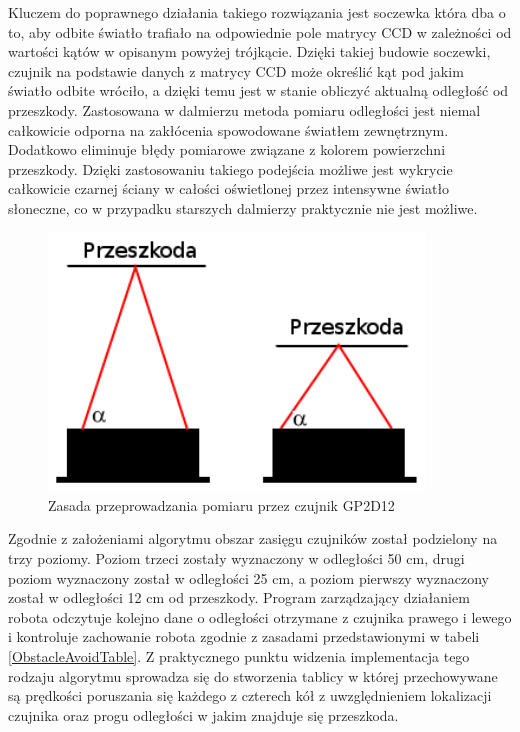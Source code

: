Kluczem do poprawnego działania takiego rozwiązania jest soczewka która dba o to, aby
odbite światło trafiało na odpowiednie pole matrycy CCD w zależności od wartości
kątów w opisanym powyżej trójkącie. Dzięki takiej budowie soczewki, czujnik na
podstawie danych z matrycy CCD może określić kąt pod jakim światło odbite
wróciło, a dzięki temu jest w stanie obliczyć aktualną odległość od przeszkody.
Zastosowana w dalmierzu metoda pomiaru odległości jest niemal całkowicie odporna
na zakłócenia spowodowane światłem zewnętrznym. Dodatkowo eliminuje błędy
pomiarowe związane z kolorem powierzchni przeszkody. Dzięki zastosowaniu takiego
podejścia możliwe jest wykrycie całkowicie czarnej ściany w całości oświetlonej
przez intensywne światło słoneczne, co w przypadku starszych dalmierzy
praktycznie nie jest możliwe.

\begin{figure}[h!]
 \centering
 \includegraphics[width=100mm]{../images/ch04/gp2d12_operation_theory.png}
 \caption{Zasada przeprowadzania pomiaru przez czujnik GP2D12}
 \label{fig:SharpGP2D12_opertaion_theory}
\end{figure} 

Zgodnie z założeniami algorytmu obszar zasięgu czujników został podzielony na
trzy poziomy. Poziom trzeci zostały wyznaczony w odległości 50 cm, drugi poziom
wyznaczony został w odległości 25 cm, a poziom pierwszy wyznaczony został w
odległości 12 cm od przeszkody. Program zarządzający działaniem robota odczytuje
kolejno dane o odległości otrzymane z czujnika prawego i lewego i kontroluje
zachowanie robota zgodnie z zasadami przedstawionymi w tabeli
\ref{ObstacleAvoidTable}. Z praktycznego punktu widzenia implementacja tego
rodzaju algorytmu sprowadza się do stworzenia tablicy w której przechowywane są
prędkości poruszania się każdego z czterech kół z uwzględnieniem lokalizacji
czujnika oraz progu odległości w jakim znajduje się przeszkoda.

